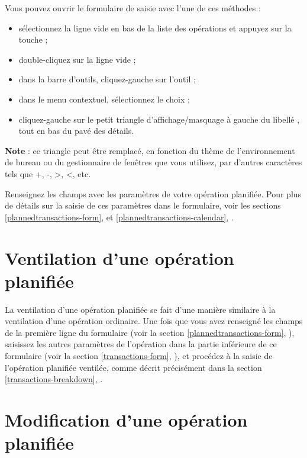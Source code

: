 Vous pouvez ouvrir le formulaire de saisie avec l'une de ces méthodes :

\begin{itemize}
	 \item sélectionnez la ligne vide en bas de la liste des opérations et appuyez sur la touche  ;
	 \item double-cliquez sur la ligne vide ;
	 \item dans la barre d'outils, cliquez-gauche sur l'outil  ;
	 \item dans le menu contextuel, sélectionnez le choix  ;
	 \item cliquez-gauche sur le petit triangle d'affichage/masquage à gauche du libellé , tout en bas du pavé des détails. 
\end{itemize}

\textbf{Note} : ce triangle peut être remplacé, en fonction du thème de l'environnement de bureau ou du gestionnaire de fenêtres que vous utilisez, par d'autres caractères tels que +, -, >, <, etc.

Renseignez les champs avec les paramètres de votre opération planifiée. Pour plus de détails sur la saisie de ces paramètres dans le formulaire, voir les sections \vref{plannedtransactions-form},  et \vref{plannedtransactions-calendar}, . 


\section{Ventilation d'une opération planifiée\label{plannedtransactions-breakdown}}


La ventilation d'une opération planifiée se fait d'une manière similaire à la ventilation d'une opération ordinaire. Une fois que vous avez renseigné les champs  de la première ligne du formulaire (voir la section \vref{plannedtransactions-form}, ), saisissez les autres paramètres de l'opération dans la partie inférieure de ce formulaire (voir la section \vref{transactions-form}, ), et procédez à la saisie de l'opération planifiée ventilée, comme décrit précisément dans la section \vref{transactions-breakdown}, .


\section{Modification d'une opération planifiée\label{plannedtransactions-modify}}



